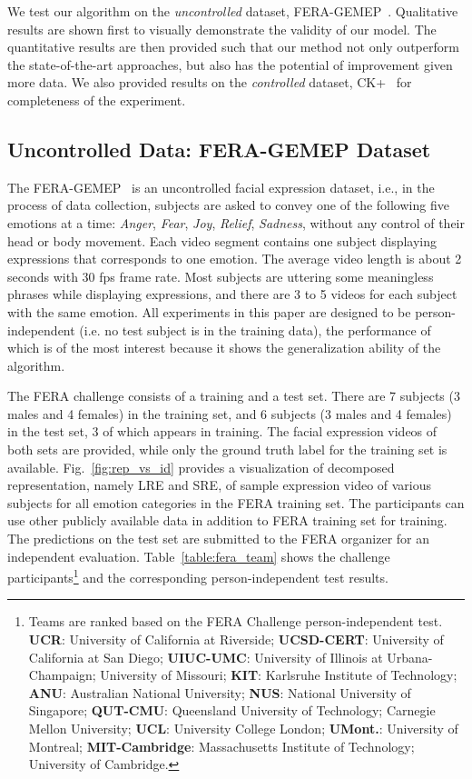 \documentclass[journal]{IEEEtran}
\begin{document}
We test our algorithm on the \textit{uncontrolled} dataset, FERA-GEMEP~\cite{FERA_data}. Qualitative results are shown first to visually demonstrate the validity of our model. The quantitative results are then provided such that our method not only outperform the state-of-the-art approaches, but also has the potential of improvement given more data. We also provided results on the \textit{controlled} dataset, CK+~\cite{CKplus} for completeness of the experiment.


\subsection{Uncontrolled Data: FERA-GEMEP Dataset}

The FERA-GEMEP~\cite{FERA_data} is an uncontrolled facial expression dataset, i.e., in the process of data collection, subjects are asked to convey one of the following five emotions at a time: \textit{Anger}, \textit{Fear}, \textit{Joy}, \textit{Relief}, \textit{Sadness}, without any control of their head or body movement. Each video segment contains one subject displaying expressions that corresponds to one emotion. The average video length is about 2 seconds with 30 fps frame rate. Most subjects are uttering some meaningless phrases while displaying expressions, and there are 3 to 5 videos for each subject with the same emotion. All experiments in this paper are designed to be person-independent (i.e. no test subject is in the training data), the performance of which is of the most interest because it shows the generalization ability of the algorithm. 


The FERA challenge consists of a training and a test set. There are 7 subjects (3 males and 4 females) in the training set, and 6 subjects (3 males and 4 females) in the test set, 3 of which appears in training. The facial expression videos of both sets are provided, while only the ground truth label for the training set is available. Fig.~\ref{fig:rep_vs_id} provides a visualization of decomposed representation, namely LRE and SRE, of sample expression video of various subjects for all emotion categories in the FERA training set. The participants can use other publicly available data in addition to FERA training set for training. The predictions on the test set are submitted to the FERA organizer for an independent evaluation. Table~\ref{table:fera_team} shows the challenge participants\footnote{\label{teams}Teams are ranked based on the FERA Challenge person-independent test. \textbf{UCR}: University of California at Riverside; \textbf{UCSD-CERT}: University of California at San Diego; \textbf{UIUC-UMC}: University of Illinois at Urbana-Champaign; University of Missouri; \textbf{KIT}: Karlsruhe Institute of Technology; \textbf{ANU}: Australian National University; \textbf{NUS}: National University of Singapore; \textbf{QUT-CMU}: Queensland University of Technology; Carnegie Mellon University; \textbf{UCL}: University College London; \textbf{UMont.}: University of Montreal;  \textbf{MIT-Cambridge}: Massachusetts Institute of Technology; University of Cambridge.} and the corresponding person-independent test results. 
\end{document}
